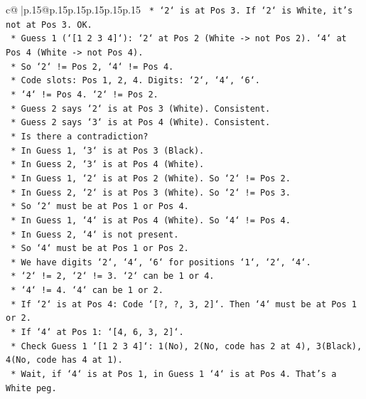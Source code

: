 \documentclass{article}
\begin{document}
{\begin{supertabular}{c@{$\;$}|p{.15\linewidth}@{}p{.15\linewidth}p{.15\linewidth}p{.15\linewidth}p{.15\linewidth}p{.15\linewidth}}
{{{\texttt{            *   `2` is at Pos 3. If `2` is White, it's not at Pos 3. OK.} \\
\texttt{            *   Guess 1 (`{[}1 2 3 4{]}`): `2` at Pos 2 (White {-}> not Pos 2). `4` at Pos 4 (White {-}> not Pos 4).} \\
\texttt{            *   So `2` != Pos 2, `4` != Pos 4.} \\
\texttt{            *   Code slots: Pos 1, 2, 4. Digits: `2`, `4`, `6`.} \\
\texttt{            *   `4` != Pos 4. `2` != Pos 2.} \\
\texttt{            *   Guess 2 says `2` is at Pos 3 (White). Consistent.} \\
\texttt{            *   Guess 2 says `3` is at Pos 4 (White). Consistent.} \\
\texttt{            *   Is there a contradiction?} \\
\texttt{            *   In Guess 1, `3` is at Pos 3 (Black).} \\
\texttt{            *   In Guess 2, `3` is at Pos 4 (White).} \\
\texttt{            *   In Guess 1, `2` is at Pos 2 (White). So `2` != Pos 2.} \\
\texttt{            *   In Guess 2, `2` is at Pos 3 (White). So `2` != Pos 3.} \\
\texttt{            *   So `2` must be at Pos 1 or Pos 4.} \\
\texttt{            *   In Guess 1, `4` is at Pos 4 (White). So `4` != Pos 4.} \\
\texttt{            *   In Guess 2, `4` is not present.} \\
\texttt{            *   So `4` must be at Pos 1 or Pos 2.} \\
\texttt{            *   We have digits `2`, `4`, `6` for positions `1`, `2`, `4`.} \\
\texttt{            *   `2` != 2, `2` != 3. `2` can be 1 or 4.} \\
\texttt{            *   `4` != 4. `4` can be 1 or 2.} \\
\texttt{            *   If `2` is at Pos 4: Code `{[}?, ?, 3, 2{]}`. Then `4` must be at Pos 1 or 2.} \\
\texttt{                *   If `4` at Pos 1: `{[}4, 6, 3, 2{]}`.} \\
\texttt{                *   Check Guess 1 `{[}1 2 3 4{]}`: 1(No), 2(No, code has 2 at 4), 3(Black), 4(No, code has 4 at 1).} \\
\texttt{                *   Wait, if `4` is at Pos 1, in Guess 1 `4` is at Pos 4. That's a White peg.} \\
}}}
\end{supertabular}}
\end{document}
